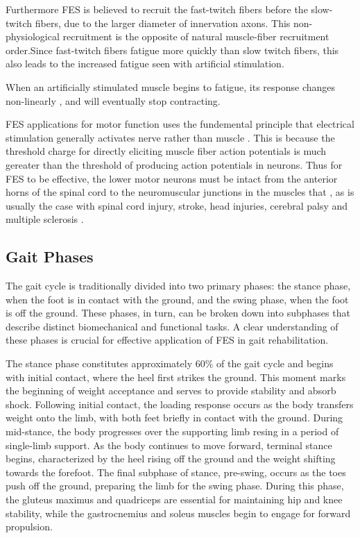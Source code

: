 Furthermore FES is believed to recruit the fast-twitch fibers before the slow-twitch fibers, due to the larger diameter of innervation axons. This non-physiological recruitment is the opposite of natural muscle-fiber recruitment order.Since fast-twitch fibers fatigue more quickly than slow twitch fibers, this also leads to the increased fatigue seen with artificial stimulation. \cite{lynch_functional_2008}

When an artificially stimulated muscle begins to fatigue, its response changes non-linearly \cite{lynch_functional_2008}, and will eventually stop contracting. 

FES applications for motor function uses the fundemental principle that electrical stimulation generally activates nerve rather than muscle \cite{peckham_functional_2005}. This is because the threshold charge for directly eliciting muscle fiber action potentials is much gereater than the threshold of producing action potentials in neurons. Thus for FES to be effective, the lower motor neurons must be intact from the anterior horns of the spinal cord to the neuromuscular junctions in the muscles that , as is usually the case with spinal cord injury, stroke, head injuries, cerebral palsy and multiple sclerosis \cite{gregory_recruitment_2005}. 

\subsection{Gait Phases}
The gait cycle is traditionally divided into two primary phases: the stance phase, when the foot is in contact with the ground, and the swing phase, when the foot is off the ground. These phases, in turn, can be broken down into subphases that describe distinct biomechanical and functional tasks. A clear understanding of these phases is crucial for effective application of FES in gait rehabilitation.

The stance phase constitutes approximately 60\% of the gait cycle and begins with initial contact, where the heel first strikes the ground. This moment marks the beginning of weight acceptance and serves to provide stability and absorb shock. Following initial contact, the loading response occurs as the body transfers weight onto the limb, with both feet briefly in contact with the ground. During mid-stance, the body progresses over the supporting limb resing in a period of single-limb support. As the body continues to move forward, terminal stance begins, characterized by the heel rising off the ground and the weight shifting towards the forefoot. The final subphase of stance, pre-swing, occurs as the toes push off the ground, preparing the limb for the swing phase. During this phase, the gluteus maximus and quadriceps are essential for maintaining hip and knee stability, while the gastrocnemius and soleus muscles begin to engage for forward propulsion.


